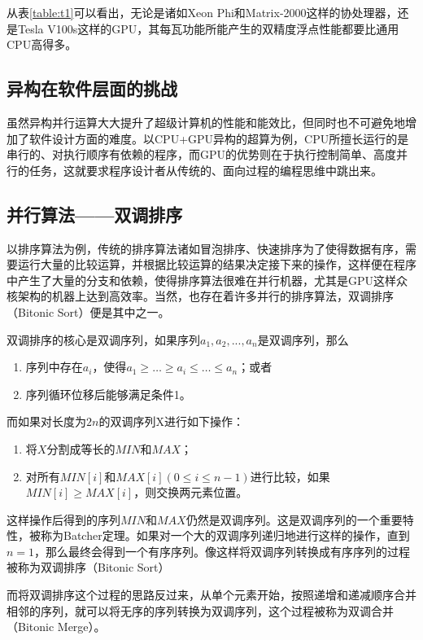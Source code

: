\documentclass[UTF8,a4paper,10pt]{ctexart}
\begin{document}
从表\ref{table:t1}可以看出，无论是诸如Xeon Phi和Matrix-2000这样的协处理器，还是Tesla V100s这样的GPU，其每瓦功能所能产生的双精度浮点性能都要比通用CPU高得多。

\subsection{异构在软件层面的挑战}
虽然异构并行运算大大提升了超级计算机的性能和能效比，但同时也不可避免地增加了软件设计方面的难度。以CPU+GPU异构的超算为例，CPU所擅长运行的是串行的、对执行顺序有依赖的程序，而GPU的优势则在于执行控制简单、高度并行的任务，这就要求程序设计者从传统的、面向过程的编程思维中跳出来。\cite{supercom_energy_prog}

\subsection{并行算法——双调排序}
以排序算法为例，传统的排序算法诸如冒泡排序、快速排序为了使得数据有序，需要运行大量的比较运算，并根据比较运算的结果决定接下来的操作，这样便在程序中产生了大量的分支和依赖，使得排序算法很难在并行机器，尤其是GPU这样众核架构的机器上达到高效率。当然，也存在着许多并行的排序算法，双调排序（Bitonic Sort）便是其中之一。

双调排序的核心是双调序列，如果序列$a_{1},a_{2},...,a_{n}$是双调序列，那么
\begin{enumerate}
  \item 序列中存在$a_{i}$，使得$a_{1}\ge …\ge a_{i}\le …\le a_{n}$；或者
  \item 序列循环位移后能够满足条件1。
\end{enumerate}


而如果对长度为$2n$的双调序列X进行如下操作：
\begin{enumerate}
  \item 将$X$分割成等长的$MIN和MAX$；
  \item 对所有$MIN[i]$和$MAX[i] (0\le i\le n-1)$进行比较，如果$MIN[i]\ge MAX[i]$，则交换两元素位置。
\end{enumerate}


这样操作后得到的序列$MIN$和$MAX$仍然是双调序列。这是双调序列的一个重要特性，被称为Batcher定理。如果对一个大的双调序列递归地进行这样的操作，直到$n=1$，那么最终会得到一个有序序列。像这样将双调序列转换成有序序列的过程被称为双调排序（Bitonic Sort）

而将双调排序这个过程的思路反过来，从单个元素开始，按照递增和递减顺序合并相邻的序列，就可以将无序的序列转换为双调序列，这个过程被称为双调合并（Bitonic Merge）。\cite{bitonic_jianshu}
\end{document}
